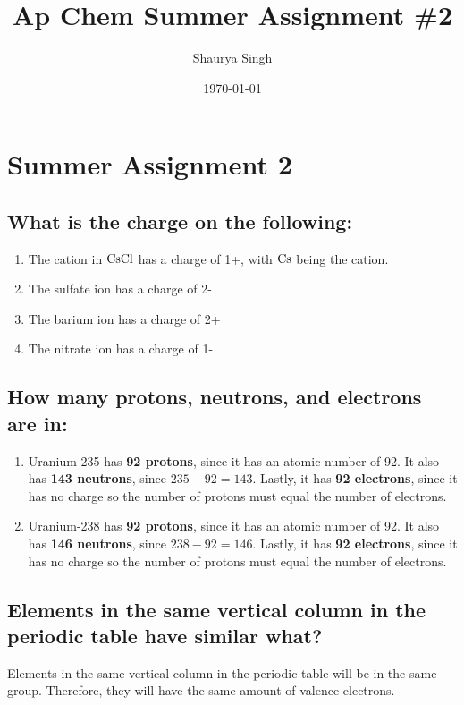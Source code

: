 \documentclass[11pt]{article}
\author{Shaurya Singh}
\date{\today}
\title{Ap Chem Summer Assignment \#2}
\begin{document}
\maketitle

\section{Summer Assignment 2}
\label{sec:org6d1d423}
\subsection{What is the charge on the following:}
\label{sec:org279bf1f}
\begin{enumerate}
\item The cation in \(\ce{CsCl}\) has a charge of 1+, with \(\ce{Cs}\) being the cation.
\item The sulfate ion has a charge of 2-
\item The barium ion has a charge of 2+
\item The nitrate ion has a charge of 1-
\end{enumerate}

\subsection{How many protons, neutrons, and electrons are in:}
\label{sec:org9c5b7a8}
\begin{enumerate}
\item Uranium-235 has \textbf{92 protons}, since it has an atomic number of 92. It also has \textbf{143 neutrons}, since \(235-92=143\). Lastly, it has \textbf{92 electrons}, since it has no charge so the number of protons must equal the number of electrons.
\item Uranium-238 has \textbf{92 protons}, since it has an atomic number of 92. It also has \textbf{146 neutrons}, since \(238-92=146\). Lastly, it has \textbf{92 electrons}, since it has no charge so the number of protons must equal the number of electrons.
\end{enumerate}

\subsection{Elements in the same vertical column in the periodic table have similar what?}
\label{sec:org5bd3603}
Elements in the same vertical column in the periodic table will be in the same group. Therefore, they will have the same amount of valence electrons.
\end{document}
